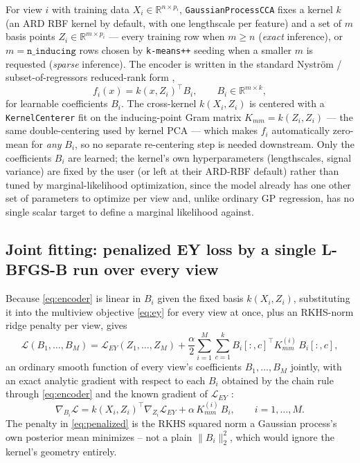 \documentclass[11pt]{article}
\newcommand{\R}{\mathbb{R}}
\begin{document}
For view $i$ with training data $X_i \in \R^{n\times p_i}$, \texttt{GaussianProcessCCA} fixes a kernel $k$ (an ARD RBF kernel by default, with one lengthscale per feature) and a set of $m$ basis points $Z_i \in \R^{m \times p_i}$ --- every training row when $m \ge n$ (\emph{exact} inference), or $m = \texttt{n\_inducing}$ rows chosen by \texttt{k-means++} seeding \citep{quinonero2005unifying} when a smaller $m$ is requested (\emph{sparse} inference). The encoder is written in the standard Nystr\"om / subset-of-regressors reduced-rank form \citep{williams2001using,quinonero2005unifying},
\begin{equation}
f_i(x) = k(x, Z_i)^\top B_i, \qquad B_i \in \R^{m \times k},
\label{eq:encoder}
\end{equation}
for learnable coefficients $B_i$. The cross-kernel $k(X_i, Z_i)$ is centered with a \texttt{KernelCenterer} fit on the inducing-point Gram matrix $K_{mm} = k(Z_i, Z_i)$ --- the same double-centering used by kernel PCA --- which makes $f_i$ automatically zero-mean for \emph{any} $B_i$, so no separate re-centering step is needed downstream. Only the coefficients $B_i$ are learned; the kernel's own hyperparameters (lengthscales, signal variance) are fixed by the user (or left at their ARD-RBF default) rather than tuned by marginal-likelihood optimization, since the model already has one other set of parameters to optimize per view and, unlike ordinary GP regression, has no single scalar target to define a marginal likelihood against.

\subsection{Joint fitting: penalized EY loss by a single L-BFGS-B run over every view}

Because \eqref{eq:encoder} is linear in $B_i$ given the fixed basis $k(X_i, Z_i)$, substituting it into the multiview objective \eqref{eq:ey} for every view at once, plus an RKHS-norm ridge penalty per view, gives
\begin{equation}
\mathcal{L}(B_1, \dots, B_M) = \mathcal{L}_{EY}(Z_1, \dots, Z_M) + \frac{\alpha}{2}\sum_{i=1}^M\sum_{c=1}^k B_i[:,c]^\top K_{mm}^{(i)}\, B_i[:,c],
\label{eq:penalized}
\end{equation}
an ordinary smooth function of every view's coefficients $B_1, \dots, B_M$ jointly, with an exact analytic gradient with respect to each $B_i$ obtained by the chain rule through \eqref{eq:encoder} and the known gradient of $\mathcal{L}_{EY}$ \citep{chapman2024unconstrained}:
\begin{equation}
\nabla_{B_i}\mathcal{L} = k(X_i, Z_i)^\top \nabla_{Z_i}\mathcal{L}_{EY} + \alpha\, K_{mm}^{(i)}\, B_i, \qquad i = 1, \dots, M.
\label{eq:grad}
\end{equation}
The penalty in \eqref{eq:penalized} is the RKHS squared norm a Gaussian process's own posterior mean minimizes -- not a plain $\lVert B_i\rVert_2^2$, which would ignore the kernel's geometry entirely.
\end{document}
